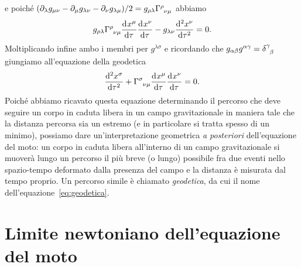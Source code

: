 e poiché
$(\partial_{\lambda} g_{\mu\nu} - \partial_{\mu}g_{\lambda\nu}
- \partial_{\nu}g_{\lambda\mu})/2 = g_{\rho\lambda}
\tensor{\Gamma}{^{\rho}_{\nu\mu}}$ abbiamo
\begin{equation}
  g_{\rho\lambda} \tensor{\Gamma}{^{\rho}_{\nu\mu}} \toder{x^{\mu}}{\tau}
  \toder{x^{\nu}}{\tau} - g_{\lambda\nu}\toder[2]{x^{\nu}}{\tau} = 0.
\end{equation}
Moltiplicando infine ambo i membri per $g^{\lambda\sigma}$ e ricordando che
$g_{\alpha\beta}g^{\alpha\gamma} = \tensor{\delta}{^{\gamma}_{\beta}}$ giungiamo
all'equazione della geodetica
\begin{equation}
  \toder[2]{x^{\sigma}}{\tau} + \tensor{\Gamma}{^{\sigma}_{\nu\mu}}
  \toder{x^{\mu}}{\tau} \toder{x^{\nu}}{\tau} = 0.
\end{equation}
Poiché abbiamo ricavato questa equazione determinando il percorso che deve
seguire un corpo in caduta libera in un campo gravitazionale in maniera tale che
la distanza percorsa sia un estremo (e in particolare si tratta spesso di un
minimo), possiamo dare un'interpretazione geometrica \emph{a posteriori}
dell'equazione del moto: un corpo in caduta libera all'interno di un campo
gravitazionale si muoverà lungo un percorso il più breve (o lungo) possibile fra
due eventi nello spazio-tempo deformato dalla presenza del campo e la distanza è
misurata dal tempo proprio.  Un percorso simile è chiamato \emph{geodetica}, da
cui il nome dell'equazione~\eqref{eq:geodetica}.

\section{Limite newtoniano dell'equazione del moto}
\label{sec:limite-newtoniano}

